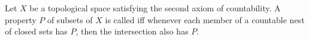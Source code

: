Let $X$ be a topological space satisfying the second axiom of countability. A property $P$ of subsets of $X$ is called  iff whenever each member of a countable nest of closed sets has $P$, then the intersection also has $P$.
